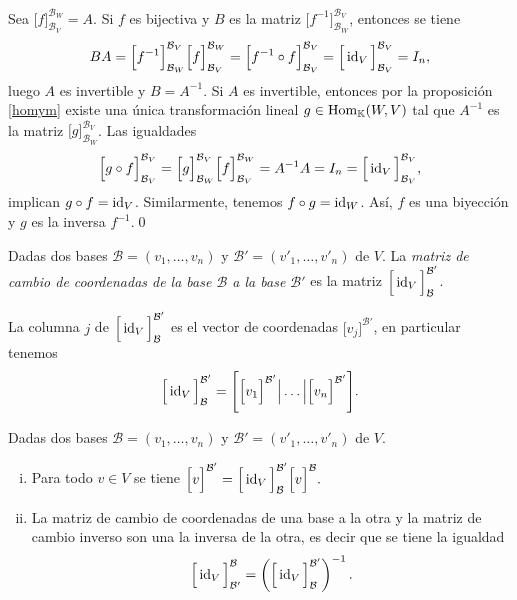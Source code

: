 Sea $\Big[ f \Big]^{\mathcal{B}_W}_{\mathcal{B}_V}=A$. Si $f$ es bijectiva y $B$ es la matriz $\Big[ f^{-1} \Big]_{\mathcal{B}_W}^{\mathcal{B}_V}$, entonces se tiene
$$BA=\Big[ f^{-1} \Big]_{\mathcal{B}_W}^{\mathcal{B}_V}\Big[ f \Big]^{\mathcal{B}_W}_{\mathcal{B}_V}= \Big[ f^{-1}\circ f \Big]^{\mathcal{B}_V}_{\mathcal{B}_V}=\Big[\operatorname{id}_V\Big]^{\mathcal{B}_V}_{\mathcal{B}_V}=I_n,$$
luego $A$ es invertible y $B=A^{-1}$. Si $A$ es invertible, entonces por la proposici\'on \ref{homym} existe una \'unica transformaci\'on lineal $g\in \operatorname{Hom}_{\mathbb{K}}(W,V)$ tal que $A^{-1}$ es la matriz $\Big[ g \Big]^{\mathcal{B}_V}_{\mathcal{B}_W}$. Las igualdades
$$\Big[ g\circ f \Big]^{\mathcal{B}_V}_{\mathcal{B}_V}=\Big[ g \Big]^{\mathcal{B}_V}_{\mathcal{B}_W}\Big[ f \Big]^{\mathcal{B}_W}_{\mathcal{B}_V}=A^{-1}A=I_n=\Big[ \operatorname{id}_V \Big]^{\mathcal{B}_V}_{\mathcal{B}_V},$$
implican $g\circ f=\operatorname{id}_V$. Similarmente, tenemos $f\circ g=\operatorname{id}_W$. As\'i, $f$ es una biyecci\'on y $g$ es la inversa $f^{-1}$.\qed

\begin{defn}
Dadas dos bases $\mathcal{B}=(v_1,\ldots,v_n)$ y $\mathcal{B}'=(v'_1,\ldots,v'_n)$ de $V$. La \emph{matriz de cambio de coordenadas de la base $\mathcal{B}$ a la base $\mathcal{B}'$} es la matriz $\Big[\operatorname{id}_V\Big]^{\mathcal{B}'}_\mathcal{B}$.
\end{defn}

\begin{obs}
La columna $j$ de $\Big[\operatorname{id}_V\Big]^{\mathcal{B}'}_{\mathcal{B}}$ es el vector de coordenadas $\Big[ v_j\Big]^{\mathcal{B}'}$, en particular tenemos
$$\Big[\operatorname{id}_V\Big]^{\mathcal{B}'}_{\mathcal{B}}=\Bigg[\Big[ v_1\Big]^{\mathcal{B}'}\Big|\ldots \Big| \Big[ v_n\Big]^{\mathcal{B}'}\Bigg].$$
\end{obs}

\begin{prop}
Dadas dos bases $\mathcal{B}=(v_1,\ldots,v_n)$ y $\mathcal{B}'=(v'_1,\ldots,v'_n)$ de $V$.
\begin{enumerate}[(i)]
\item Para todo $v\in V$ se tiene $\Big[v\Big]^{\mathcal{B}'}=\Big[\operatorname{id}_V\Big]^{\mathcal{B}'}_\mathcal{B}\Big[v\Big]^{\mathcal{B}}.$
\item La matriz de cambio de coordenadas de una base a la otra y la matriz de cambio inverso son una la inversa de la otra, es decir que se tiene la igualdad
$$\Big[\operatorname{id}_V\Big]^{\mathcal{B}}_{\mathcal{B}'}=\left(\Big[\operatorname{id}_V\Big]^{\mathcal{B}'}_{\mathcal{B}}\right)^{-1}.$$
\end{enumerate}
\end{prop}

